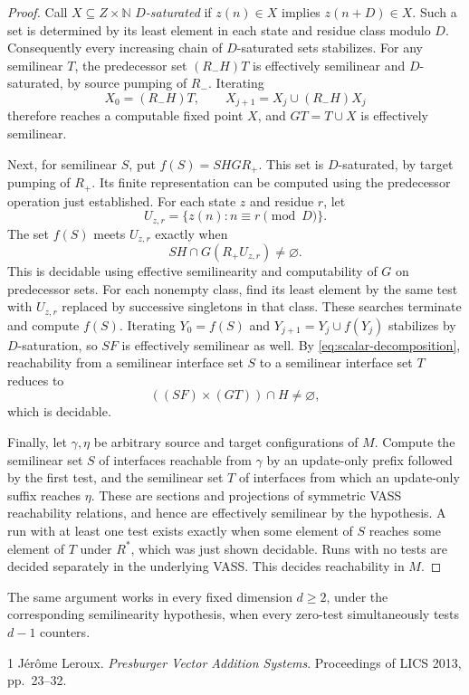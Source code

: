 \documentclass[11pt]{article}
\begin{document}
\begin{proof}
Call $X\subseteq Z\times\mathbb{N}$ \emph{$D$-saturated} if
$z(n)\in X$ implies $z(n+D)\in X$. Such a set is determined by
its least element in each state and residue class modulo $D$.
Consequently every increasing chain of $D$-saturated sets stabilizes.
For any semilinear $T$, the predecessor set $(R_-H)T$ is effectively
semilinear and $D$-saturated, by source pumping of $R_-$.
Iterating
\[
  X_0=(R_-H)T,\qquad X_{j+1}=X_j\cup(R_-H)X_j
\]
therefore reaches a computable fixed point $X$, and $GT=T\cup X$
is effectively semilinear.

Next, for semilinear $S$, put $f(S)=SHGR_+$. This set is
$D$-saturated, by target pumping of $R_+$. Its finite representation
can be computed using the predecessor operation just established.
For each state $z$ and residue $r$, let
\[
  U_{z,r}=\{z(n):n\equiv r\pmod D\}.
\]
The set $f(S)$ meets $U_{z,r}$ exactly when
\[
  SH\cap G(R_+U_{z,r})\neq\varnothing.
\]
This is decidable using effective semilinearity and computability
of $G$ on predecessor sets. For each nonempty class, find its least
element by the same test with $U_{z,r}$ replaced by successive
singletons in that class. These searches terminate and compute
$f(S)$. Iterating $Y_0=f(S)$ and
$Y_{j+1}=Y_j\cup f(Y_j)$ stabilizes by $D$-saturation, so $SF$
is effectively semilinear as well. By
\eqref{eq:scalar-decomposition}, reachability from a semilinear
interface set $S$ to a semilinear interface set $T$ reduces to
\[
  ((SF)\times(GT))\cap H\neq\varnothing,
\]
which is decidable.

Finally, let $\gamma,\eta$ be arbitrary source and target
configurations of $M$. Compute the semilinear set $S$ of interfaces
reachable from $\gamma$ by an update-only prefix followed by the
first test, and the semilinear set $T$ of interfaces from which an
update-only suffix reaches $\eta$. These are sections and
projections of symmetric VASS reachability relations, and hence
are effectively semilinear by the hypothesis. A run with at least
one test exists exactly when some element of $S$ reaches some
element of $T$ under $R^*$, which was just shown decidable.
Runs with no tests are decided separately in the underlying VASS.
This decides reachability in $M$.
\end{proof}

The same argument works in every fixed dimension $d\geq2$, under
the corresponding semilinearity hypothesis, when every zero-test
simultaneously tests $d-1$ counters.

\begin{thebibliography}{1}
J\'er\^ome Leroux.
\emph{Presburger Vector Addition Systems}.
Proceedings of LICS 2013, pp.~23--32.
\end{thebibliography}
\end{document}
